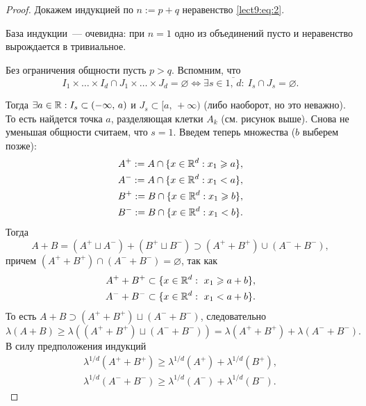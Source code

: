\begin{theorem}
\begin{proof}
        Докажем индукцией по $n:=p+q$ неравенство \eqref{lect9:eq:2}.

        База индукции~--- очевидна: при $n=1$ одно из объединений пусто и неравенство вырождается
        в тривиальное.

        Без ограничения общности пусть $p>q$.
        Вспомним, что
        \[
            I_1\times \ldots\times I_d\cap J_1\times \ldots\times J_d = \varnothing
            \Leftrightarrow \exists s\in\overline{1,\, d}:\: I_s\cap J_s=\varnothing.
        \]

        \begin{center}
            
        \end{center}

        Тогда $\exists a\in\mathbb{R}: I_s\subset (-\infty,\, a)$ и $J_s\subset [a,\, +\infty)$ (либо наоборот, но это неважно).
        То есть найдется точка $a$, разделяющая клетки $A_k$ (см. рисунок выше).
        Снова не уменьшая общности считаем, что $s=1$. Введем теперь множества ($b$ выберем позже):
        \begin{align*}
            A^+:=A\cap \{x\in\mathbb{R}^d: x_1\geqslant a\}, \\
            A^-:=A\cap \{x\in\mathbb{R}^d: x_1<a\},          \\
            B^+:=B\cap \{x\in\mathbb{R}^d: x_1\geqslant b\}, \\
            B^-:=B\cap \{x\in\mathbb{R}^d: x_1< b\}.
        \end{align*}
        Тогда
        \[
            A+B=(A^+\sqcup A^-)+(B^+\sqcup B^-)\supset (A^++B^+)\cup(A^-+B^-),
        \]
        причем $(A^++B^+)\cap(A^-+B^-)=\varnothing$, так как
        \begin{align*}
            A^++B^+\subset \{x\in\mathbb{R}^d:\ x_1\geqslant a+b\}, \\
            A^-+B^-\subset \{x\in\mathbb{R}^d:\ x_1< a+b\}.
        \end{align*}
        То есть $A+B\supset (A^++B^+)\sqcup(A^-+B^-)$, следовательно
        \[
            \lambda(A+B)\geqslant
            \lambda((A^++B^+)\sqcup(A^-+B^-))=
            \lambda(A^++B^+)+\lambda(A^-+B^-).
        \]
        В силу предположения индукций
        \begin{align*}
            \lambda^{1/d}(A^++B^+)\geqslant\lambda^{1/d}(A^+)+\lambda^{1/d}(B^+), \\
            \lambda^{1/d}(A^-+B^-)\geqslant\lambda^{1/d}(A^-)+\lambda^{1/d}(B^-).
        \end{align*}


\end{proof}
\end{theorem}
